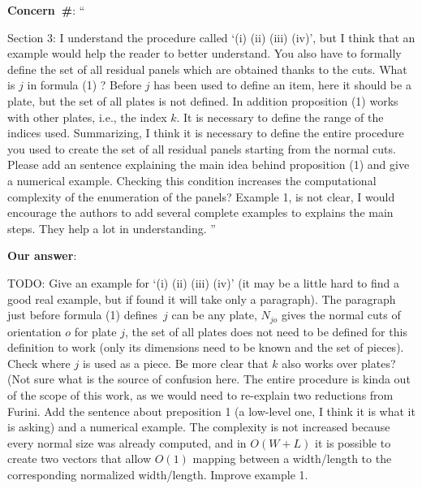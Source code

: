 \documentclass[smallextended]{svjour3}       %
\makeatletter
\newcommand\gobblepars{%
    \@ifnextchar\par%
        {\expandafter\gobblepars\@gobble}%
        {}}
\newcounter{concern}
\newenvironment{concern}{%
    \refstepcounter{concern}\par\smallskip\noindent%
    \textbf{Concern~\#\theconcern}: ``\itshape\gobblepars}%
    {\unskip''\smallskip}
\newcounter{answer}
\newenvironment{answer}{%
    \refstepcounter{answer}\par\smallskip\noindent%
    \textbf{Our answer}: \gobblepars}%
    {\unskip\bigskip}
\makeatother
\begin{document}
\begin{concern}
Section 3: I understand the procedure called `(i) (ii) (iii) (iv)', but I think that an example would help the reader to better understand. You also have to formally define the set of all residual panels which are obtained thanks to the cuts. What is \(j\) in formula (1) ? Before \(j\) has been used to define an item, here it should be a plate, but the set of all plates is not defined. In addition proposition (1) works with other plates, i.e., the index \(k\). It is necessary to define the range of the indices used. Summarizing, I think it is necessary to define the entire procedure you used to create the set of all residual panels starting from the normal cuts. Please add an sentence explaining the main idea behind proposition (1) and give a numerical example. Checking this condition increases the computational complexity of the enumeration of the panels? Example 1, is not clear, I would encourage the authors to add several complete examples to explains the main steps. They help a lot in understanding.
\end{concern}
\begin{answer}
TODO: Give an example for `(i) (ii) (iii) (iv)' (it may be a little hard to find a good real example, but if found it will take only a paragraph). The paragraph just before formula (1) defines~\(j\) can be any plate, \(N_{jo}\) gives the normal cuts of orientation \(o\) for plate \(j\), the set of all plates does not need to be defined for this definition to work (only its dimensions need to be known and the set of pieces). Check where \(j\) is used as a piece. Be more clear that \(k\) also works over plates? (Not sure what is the source of confusion here. The entire procedure is kinda out of the scope of this work, as we would need to re-explain two reductions from Furini. Add the sentence about preposition 1 (a low-level one, I think it is what it is asking) and a numerical example. The complexity is not increased because every normal size was already computed, and in \(O(W + L)\) it is possible to create two vectors that allow \(O(1)\) mapping between a width/length to the corresponding normalized width/length. Improve example 1.
\end{answer}
\end{document}
